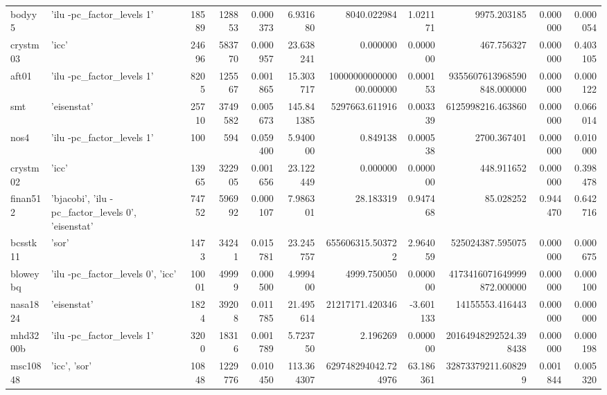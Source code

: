 \begin{tabular}{llrrrrrrrrr}
bodyy5 & {'ilu -pc\_factor\_levels 1'} & 18589 & 128853 & 0.000373 & 6.931680 & 8040.022984 & 1.021171 & 9975.203185 & 0.000000 & 0.000054 \\
crystm03 & {'icc'} & 24696 & 583770 & 0.000957 & 23.638241 & 0.000000 & 0.000000 & 467.756327 & 0.000000 & 0.403105 \\
aft01 & {'ilu -pc\_factor\_levels 1'} & 8205 & 125567 & 0.001865 & 15.303717 & 1000000000000000.000000 & 0.000153 & 9355607613968590848.000000 & 0.000000 & 0.000122 \\
smt & {'eisenstat'} & 25710 & 3749582 & 0.005673 & 145.841385 & 5297663.611916 & 0.003339 & 6125998216.463860 & 0.000000 & 0.066014 \\
nos4 & {'ilu -pc\_factor\_levels 1'} & 100 & 594 & 0.059400 & 5.940000 & 0.849138 & 0.000538 & 2700.367401 & 0.000000 & 0.010000 \\
crystm02 & {'icc'} & 13965 & 322905 & 0.001656 & 23.122449 & 0.000000 & 0.000000 & 448.911652 & 0.000000 & 0.398478 \\
finan512 & {'bjacobi', 'ilu -pc\_factor\_levels 0', 'eisenstat'} & 74752 & 596992 & 0.000107 & 7.986301 & 28.183319 & 0.947468 & 85.028252 & 0.944470 & 0.642716 \\
bcsstk11 & {'sor'} & 1473 & 34241 & 0.015781 & 23.245757 & 655606315.503722 & 2.964059 & 525024387.595075 & 0.000000 & 0.000675 \\
bloweybq & {'ilu -pc\_factor\_levels 0', 'icc'} & 10001 & 49999 & 0.000500 & 4.999400 & 4999.750050 & 0.000000 & 4173416071649999872.000000 & 0.000000 & 0.000100 \\
nasa1824 & {'eisenstat'} & 1824 & 39208 & 0.011785 & 21.495614 & 21217171.420346 & -3.601133 & 14155553.416443 & 0.000000 & 0.000000 \\
mhd3200b & {'ilu -pc\_factor\_levels 1'} & 3200 & 18316 & 0.001789 & 5.723750 & 2.196269 & 0.000000 & 20164948292524.398438 & 0.000000 & 0.000198 \\
msc10848 & {'icc', 'sor'} & 10848 & 1229776 & 0.010450 & 113.364307 & 629748294042.724976 & 63.186361 & 32873379211.608299 & 0.001844 & 0.005320 \\
\bottomrule
\end{tabular}
